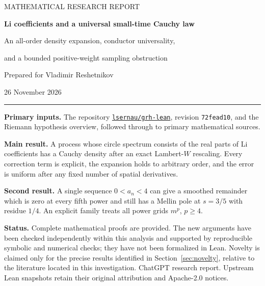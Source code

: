\documentclass[11pt,a4paper]{article}
\theoremstyle{definition}
\theoremstyle{remark}
\numberwithin{equation}{section}
\begin{document}
\hypersetup{pageanchor=false}
\begin{titlepage}
\vspace*{12mm}
{\color{MidnightBlue}\large MATHEMATICAL RESEARCH REPORT\par}
\vspace{8mm}
{\Huge\bfseries Li coefficients and a universal small-time Cauchy law\par}
\vspace{7mm}
{\Large An all-order density expansion, conductor universality,\par
and a bounded positive-weight sampling obstruction\par}
\vspace{12mm}
{\large Prepared for Vladimir Reshetnikov\par}
{\large 26 November 2026\par}
\vspace{10mm}
\hrule
\vspace{6mm}
\textbf{Primary inputs.} The repository
\href{https://github.com/lsernau/grh-lean}{\texttt{lsernau/grh-lean}},
revision \texttt{72fead10}, and the
Riemann hypothesis overview, followed through to primary mathematical
sources.

\textbf{Main result.} A process whose circle spectrum consists of the
real parts of Li coefficients has a Cauchy density after an exact
Lambert-$W$ rescaling. Every correction term is explicit, the expansion
holds to arbitrary order, and the error is uniform after any fixed
number of spatial derivatives.

\textbf{Second result.} A single sequence $0<a_n<4$ can give a smoothed
remainder which is zero at every fifth power and still has a Mellin pole
at $s=3/5$ with residue $1/4$. An explicit family treats all power grids
$m^p$, $p\geq4$.

\textbf{Status.} Complete mathematical proofs are provided. The new
arguments have been checked independently within this analysis and
supported by reproducible symbolic and numerical checks; they have not
been formalized in Lean. Novelty is claimed only for the precise results
identified in Section~\ref{sec:novelty}, relative to the literature
located in this investigation.
\vfill
{\small ChatGPT research report. Upstream Lean snapshots retain their
original attribution and Apache-2.0 notices.}
\end{titlepage}
\hypersetup{pageanchor=true}
\end{document}
